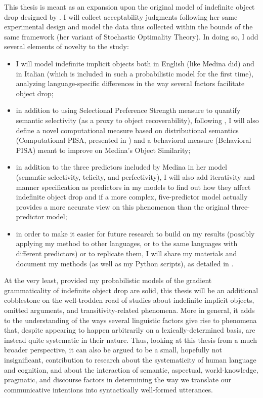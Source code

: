 This thesis is meant as an expansion upon the original model of indefinite object drop designed by \textcite{Medina2007}. I will collect acceptability judgments following her same experimental design and model the data thus collected within the bounds of the same framework (her variant of Stochastic Optimality Theory). In doing so, I add several elements of novelty to the study:
\begin{itemize}
    \item I will model indefinite implicit objects both in English (like Medina did) and in Italian (which is included in such a probabilistic model for the first time), analyzing language-specific differences in the way several factors facilitate object drop;
    \item in addition to using  Selectional Preference Strength measure to quantify semantic selectivity (as a proxy to object recoverability), following \textcite{Medina2007}, I will also define a novel computational measure based on distributional semantics (Computational PISA, presented in \textcite{CappelliLenciPISA}) and a behavioral measure (Behavioral PISA) meant to improve on Medina's Object Similarity;
    \item in addition to the three predictors included by Medina in her model (semantic selectivity, telicity, and perfectivity), I will also add iterativity and manner specification as predictors in my models to find out how they affect indefinite object drop and if a more complex, five-predictor model actually provides a more accurate view on this phenomenon than the original three-predictor model;
    \item in order to make it easier for future research to build on my results (possibly applying my method to other languages, or to the same languages with different predictors) or to replicate them, I will share my materials and document my methods (as well as my Python scripts), as detailed in .
\end{itemize}

At the very least, provided my probabilistic models of the gradient grammaticality of indefinite object drop are solid, this thesis will be an additional cobblestone on the well-trodden road of studies about indefinite implicit objects, omitted arguments, and transitivity-related phenomena. More in general, it adds to the understanding of the ways several linguistic factors give rise to phenomena that, despite appearing to happen arbitrarily on a lexically-determined basis, are instead quite systematic in their nature. Thus, looking at this thesis from a much broader perspective, it can also be argued to be a small, hopefully not insignificant, contribution to research about the systematicity of human language and cognition, and about the interaction of semantic, aspectual, world-knowledge, pragmatic, and discourse factors in determining the way we translate our communicative intentions into syntactically well-formed utterances.


